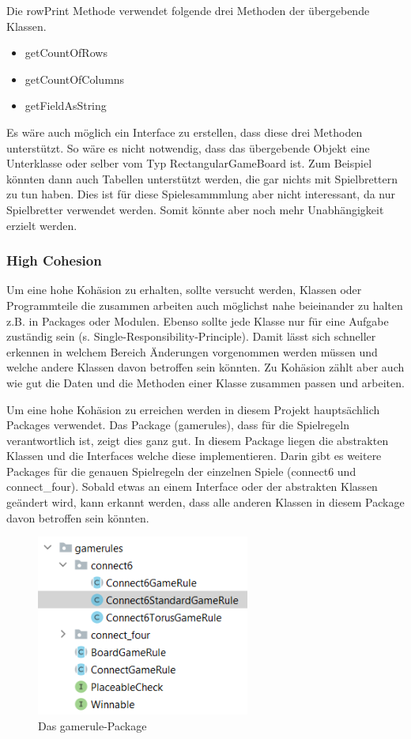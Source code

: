 \documentclass[12pt]{article}
\begin{document}
Die rowPrint Methode verwendet folgende drei Methoden der übergebende Klassen.
\begin{itemize}
\item getCountOfRows
\item getCountOfColumns
\item getFieldAsString
\end{itemize}

Es wäre auch möglich ein Interface zu erstellen, dass diese drei Methoden unterstützt. So wäre es nicht notwendig, dass das übergebende Objekt eine Unterklasse oder selber vom Typ RectangularGameBoard ist. Zum Beispiel könnten dann auch Tabellen unterstützt werden, die gar nichts mit Spielbrettern zu tun haben. Dies ist für diese Spielesammmlung aber nicht interessant, da nur Spielbretter verwendet werden. Somit könnte aber noch mehr Unabhängigkeit erzielt werden.



\newpage
\subsubsection{High Cohesion}
Um eine hohe Kohäsion zu erhalten, sollte versucht werden, Klassen oder Programmteile die zusammen arbeiten auch möglichst nahe beieinander zu halten z.B. in Packages oder Modulen. Ebenso sollte jede Klasse nur für eine Aufgabe zuständig sein (s. Single-Responsibility-Principle). Damit lässt sich schneller erkennen in welchem Bereich Änderungen vorgenommen werden müssen und welche andere Klassen davon betroffen sein könnten. Zu Kohäsion zählt aber auch wie gut die Daten und die Methoden einer Klasse zusammen passen und arbeiten.

Um eine hohe Kohäsion zu erreichen werden in diesem Projekt hauptsächlich Packages verwendet. Das Package (gamerules), dass für die Spielregeln verantwortlich ist, zeigt dies ganz gut. In diesem Package liegen die abstrakten Klassen und die Interfaces welche diese implementieren. Darin gibt es weitere Packages für die genauen Spielregeln der einzelnen Spiele (connect6 und connect\_four). Sobald etwas an einem Interface oder der abstrakten Klassen geändert wird, kann erkannt werden, dass alle anderen Klassen in diesem Package davon betroffen sein könnten.

\begin{figure}[H]
\centering
\includegraphics[width=7cm]{Bilder/gamerules}
\caption{Das gamerule-Package}
\label{fig:pkgGamerule}
\end{figure}
\end{document}
